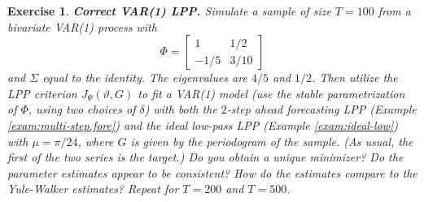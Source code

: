 \documentclass[a4paper]{book}
\newtheorem{Exercise}{Exercise}
\begin{document}
\begin{Exercise} {\bf Correct VAR(1) LPP.} \rm
\label{exer:var1lpp-correct}
 Simulate a sample of size $T=100$ from a
  bivariate VAR(1) process with 
\[
  \Phi = \left[ \begin{array}{cc} 1 & 1/2 \\ -1/5 & 3/10 \end{array} \right]
\]
 and $\Sigma$ equal to the identity.  The eigenvalues are $4/5$ and $1/2$.
 Then utilize the LPP criterion $J_{\Psi} (\vartheta, G)$ to fit a VAR(1) model (use
  the stable parametrization of $\Phi$, using two choices of $\delta$) with both 
 the $2$-step ahead forecasting LPP (Example \ref{exam:multi-step.fore}) and the 
 ideal low-pass  LPP (Example \ref{exam:ideal-low}) with 
  $\mu = \pi/24$, where $G$ is given by the periodogram of the sample.
 (As usual, the first of the two series is the target.)
 Do you obtain a unique minimizer?    Do the parameter estimates appear to be consistent? 
  How do the estimates compare to the Yule-Walker estimates?
 Repeat for $T=200$ and $T=500$.
\end{Exercise}
\end{document}

